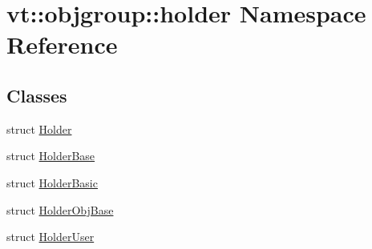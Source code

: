 \hypertarget{namespacevt_1_1objgroup_1_1holder}{}\section{vt\+:\+:objgroup\+:\+:holder Namespace Reference}
\label{namespacevt_1_1objgroup_1_1holder}
\subsection*{Classes}
\begin{DoxyCompactItemize}
\item 
struct \hyperlink{structvt_1_1objgroup_1_1holder_1_1_holder}{Holder}
\item 
struct \hyperlink{structvt_1_1objgroup_1_1holder_1_1_holder_base}{Holder\+Base}
\item 
struct \hyperlink{structvt_1_1objgroup_1_1holder_1_1_holder_basic}{Holder\+Basic}
\item 
struct \hyperlink{structvt_1_1objgroup_1_1holder_1_1_holder_obj_base}{Holder\+Obj\+Base}
\item 
struct \hyperlink{structvt_1_1objgroup_1_1holder_1_1_holder_user}{Holder\+User}
\end{DoxyCompactItemize}

